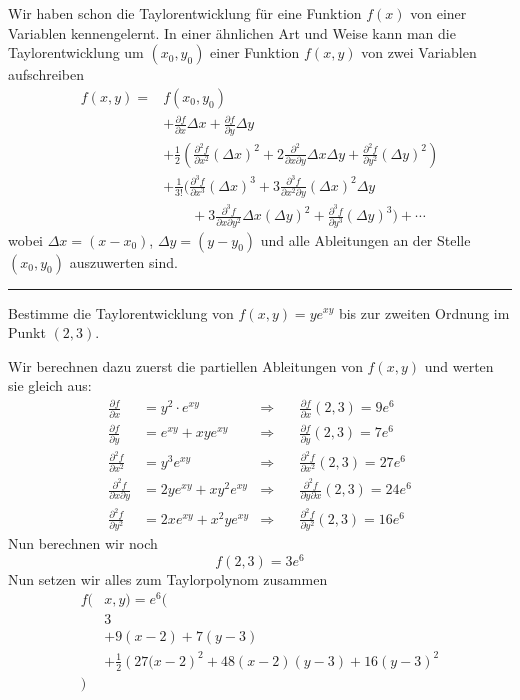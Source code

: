 \documentclass[a4paper,landscape,8pt]{extarticle}
\newcommand{\sep}{\vspace{5pt}\noindent\hrule\vspace{5pt}}
\begin{document}
\begin{multicols*}{4}
\Def Wir haben schon die Taylorentwicklung für eine Funktion $f(x)$ von einer
Variablen kennengelernt. In einer ähnlichen Art und Weise kann man die
Taylorentwicklung um $(x_0,y_0)$ einer Funktion $f(x,y)$ von zwei Variablen
aufschreiben
\begin{align*}
f(x,y) = &f(x_0,y_0) \\
&+ \frac{\partial f}{\partial x}\Delta x + \frac{\partial
f}{\partial y}\Delta y
\\
&+\frac{1}{2}\left(
\frac{\partial^2 f}{\partial x^2}(\Delta x)^2
+2\frac{\partial^2}{\partial x\partial y}\Delta x \Delta y
+\frac{\partial^2 f}{\partial y^2}(\Delta y)^2\right)
\\
&+\frac{1}{3!}\Big(
\frac{\partial^3 f}{\partial x^3}(\Delta x)^3
+3\frac{\partial^3 f}{\partial x^2 \partial y}(\Delta x)^2\Delta y\\
&\qquad +3\frac{\partial^3 f}{\partial x \partial y^2}\Delta x (\Delta y)^2
+\frac{\partial^3 f}{\partial y^3}(\Delta y)^3
\Big)
+ \cdots
\end{align*}
wobei $\Delta x = (x-x_0)$, $\Delta y = (y-y_0)$ und alle Ableitungen an der
Stelle $(x_0,y_0)$ auszuwerten sind.

\sep

\Bsp Bestimme die Taylorentwicklung von $f(x,y)=ye^{xy}$ bis zur zweiten Ordnung
im Punkt $(2,3)$.

Wir berechnen dazu zuerst die partiellen Ableitungen von $f(x,y)$ und werten
sie gleich aus:
\begin{align*}
\frac{\partial f}{\partial x} &= y^2\cdot e^{xy}
&\Longrightarrow
&\quad\frac{\partial f}{\partial x}(2,3) = 9e^6
\\
\frac{\partial f}{\partial y} &= e^{xy} + xye^{xy}
&\Longrightarrow
&\quad\frac{\partial f}{\partial y}(2,3) = 7e^6
\\
\frac{\partial^2 f}{\partial x^2} &= y^3e^{xy}
&\Longrightarrow
&\quad\frac{\partial^2 f}{\partial x^2}(2,3) = 27e^6
\\
\frac{\partial^2 f}{\partial x \partial y} &= 2ye^{xy} + xy^2e^{xy}
&\Longrightarrow
&\quad\frac{\partial^2 f}{\partial y \partial x} (2,3) = 24 e^6
\\
\frac{\partial^2 f}{\partial y^2} &= 2xe^{xy}+x^2ye^{xy}
&\Longrightarrow
&\quad\frac{\partial^2 f}{\partial y^2}(2,3) = 16 e^6
\end{align*}
Nun berechnen wir noch
\[
f(2,3) = 3e^6
\]
Nun setzen wir alles zum Taylorpolynom zusammen
\begin{align*}
f(&x,y) = e^6\Big(\\
&3\\
&+9(x-2)+7(y-3)\\
&+\frac{1}{2}\left(27(x-2\right)^2 + 48(x-2)(y-3) + 16(y-3)^2\\\Big)
\end{align*}


\end{multicols*}
\end{document}
